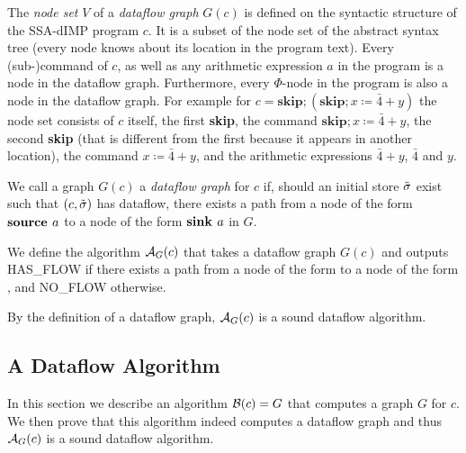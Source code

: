\begin{definition}
    The \emph{node set} $V$ of a \emph{dataflow graph} $G(c)$
    is defined on the syntactic structure
    of the SSA-dIMP program $c$. It is a subset of the node set of the abstract syntax tree
    (every node knows about its location in the program text).
    Every (sub-)command of $c$, as well as any arithmetic expression $a$ in the 
    program is a node in the dataflow graph.
    Furthermore, every $\Phi$-node in the program is also a node in the dataflow
    graph.
    For example for
    $c = \textbf{skip}; (\textbf{skip}; x \coloneqq \bar{4} + y)$
    the node set consists of $c$ itself, the first \textbf{skip}, the command 
    $\textbf{skip}; x \coloneqq \bar{4} + y$, the second \textbf{skip} (that is different 
    from the first because it appears in another location), the command
    $x \coloneqq \bar{4} + y$, and the arithmetic expressions $\bar{4}+y$,
    $\bar{4}$ and $y$.

    We call a graph $G(c)$ a \emph{dataflow graph} for $c$ if, should an initial store
    $\tilde{\sigma}{}$ exist such that $(c, \tilde{\sigma}{})$ has dataflow,
    there exists a path from a node of the form $\textbf{source }{a}$ to a node of 
    the form $\textbf{sink }{a}$ in $G$.
\end{definition}

\begin{definition}
    We define the algorithm $\operatorname{\mathcal{A}}_{G}(c)$ that takes a dataflow graph $G(c)$
    and outputs HAS\_FLOW if there exists a path from a node of the form 
    to a node of the form , and NO\_FLOW otherwise.
\end{definition}
\begin{remark}
    By the definition of a dataflow graph, $\operatorname{\mathcal{A}}_G(c)$ is a sound dataflow algorithm.
\end{remark}

\subsection{A Dataflow Algorithm}
In this section we describe an algorithm $\operatorname{\mathcal{B}}(c) = G$ that computes a 
graph $G$ for $c$. We then prove that this algorithm indeed
computes a dataflow graph and thus $\operatorname{\mathcal{A}}_G(c)$ is a sound dataflow algorithm.

